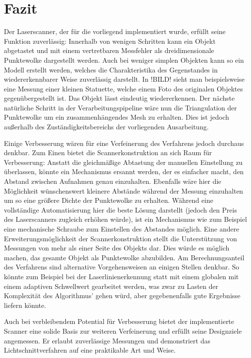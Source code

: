 \chapter{Fazit}
Der Laserscanner, der für die vorliegend implementiert wurde, erfüllt seine Funktion zuverlässig: Innerhalb von wenigen Schritten kann ein Objekt abgetastet und mit einem vertretbaren Messfehler als dreidimensionale Punktewolke dargestellt werden. Auch bei weniger simplen Objekten kann so ein Modell erstellt werden, welches die Charakteristika des Gegenstandes in wiedererkennbarer Weise zuverlässig darstellt. In !BILD! sieht man beispielsweise eine Messung einer kleinen Statuette, welche einem Foto des originalen Objektes gegenübergestellt ist. Das Objekt lässt eindeutig wiedererkennen. Der nächste natürliche Schritt in der Verarbeitungspipeline wäre nun die Triangulation der Punktewolke um ein zusammenhängendes Mesh zu erhalten. Dies ist jedoch außerhalb des Zu\-stän\-dig\-keits\-bereichs der vorliegenden Ausarbeitung.
\bigbreak

Einige Verbesserung wären für eine Verfeinerung des Verfahrens jedoch durchaus denkbar. Zum Einen bietet die Scannerkonstruktion an sich Raum für Verbesserung: Anstatt die gleichmäßige Abtastung der manuellen Einstellung zu überlassen, könnte ein Mechanismus ersannt werden, der es einfacher macht, den Abstand zwischen Aufnahmen genau einzuhalten. Ebenfalls wäre hier die Möglichkeit wünschenswert kleinere Abstände während der Messung einzuhalten um so eine größere Dichte der Punktewolke zu erhalten. Während eine vollständige Automatisierung hier die beste Lösung darstellt (jedoch den Preis des Laserscanners zugleich erhöhen würde), ist ein Mechanismus wie zum Beispiel eine mechanische Schraube zum Einstellen des Abstandes möglich. Eine andere Erweiterungsmöglichkeit der Scannerkonstruktion stellt die Unterstützung von Messungen von mehr als einer Seite des Objekts dar. Dies würde es möglich machen, das gesamte Objekt als Punktewolke abzubilden.    
\newline
Am Berechnungsanteil des Verfahrens sind alternative Vorgehensweisen an einigen Stellen denkbar. So könnte zum Beispiel bei der Laserlinienerkennung statt mit einem globalen mit einem adaptiven Schwellwert gearbeitet werden, was zwar zu Lasten der Komplexität des Algorithmus' gehen würd, aber gegebenenfalls gute Ergebnisse liefern könnte. 
\bigbreak

Auch bei verbleibendem Potential für Verbesserung bietet der implementierte Scanner eine solide Basis zur weiteren Verfeinerung und erfüllt seine Designziele angemessen. Er erlaubt zuverlässige Messungen und demonstriert das Lichtschnittverfahren auf eine praktikable Art und Weise. 